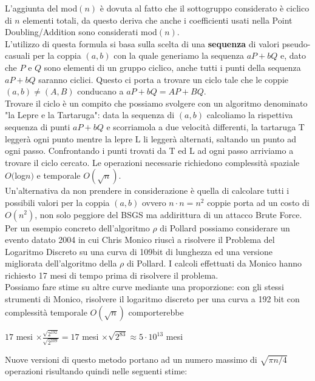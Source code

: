 \documentclass[a4paper,12pt]{tesiinfo}
\newcommand\ddfrac[2]{\frac{\displaystyle #1}{\displaystyle #2}}
\begin{document}
L'aggiunta del mod$(n)$ \`e dovuta al fatto che il sottogruppo considerato \`e ciclico di $n$ elementi totali, da questo deriva che anche i coefficienti usati nella Point Doubling/Addition sono considerati mod$(n)$.
\\
L'utilizzo di questa formula si basa sulla scelta di una \textbf{sequenza} di valori pseudo-casuali per la coppia $(a, b)$ con la quale generiamo la sequenza $aP+bQ$ e, dato che $P$ e $Q$ sono elementi di un gruppo ciclico, anche tutti i punti della sequenza $aP+bQ$ saranno ciclici. Questo ci porta a trovare un ciclo tale che le coppie $(a, b) \ne (A, B)$ conducano a $aP+bQ = AP+BQ$.
\\
Trovare il ciclo \`e un compito che possiamo svolgere con un algoritmo denominato "la Lepre e la Tartaruga": data la sequenza di $(a, b)$ calcoliamo la rispettiva sequenza di punti $aP+bQ$ e scorriamola a due velocit\`a differenti, la tartaruga T legger\`a ogni punto mentre la lepre L li legger\`a alternati, saltando un punto ad ogni passo. Confrontando i punti trovati da T ed L ad ogni passo arriviamo a trovare il ciclo cercato. Le operazioni necessarie richiedono complessit\`a spaziale $O($log$n)$ e temporale $O(\sqrt{n})$.
\\
Un'alternativa da non prendere in considerazione \`e quella di calcolare tutti i possibili valori per la coppia $(a, b)$ ovvero $n \cdot n = n^2$ coppie porta ad un costo di $O(n^2)$, non solo peggiore del BSGS ma addirittura di un attacco Brute Force.
\\
Per un esempio concreto dell'algoritmo $\rho$ di Pollard possiamo considerare un evento datato 2004 in cui Chris Monico riusc\`i a risolvere il Problema del Logaritmo Discreto su una curva di 109bit di lunghezza ed una versione migliorata dell'algoritmo della $\rho$ di Pollard. I calcoli effettuati da Monico hanno richiesto 17 mesi di tempo prima di risolvere il problema. 
\\
Possiamo fare stime su altre curve mediante una proporzione: con gli stessi strumenti di Monico, risolvere il logaritmo discreto per una curva a 192 bit con complessit\`a temporale $O(\sqrt{n})$ comporterebbe
\begin{center}
    $17$ mesi $\times \ddfrac{\sqrt{2^{192}}}{\sqrt{2^{109}}} = 17$ mesi $\times \sqrt{2^{83}} \approx 5 \cdot 10^{13}$ mesi\\
\end{center}
Nuove versioni di questo metodo portano ad un numero massimo di $\sqrt{\pi n \big / 4}$ operazioni risultando quindi nelle seguenti stime:
\end{document}
